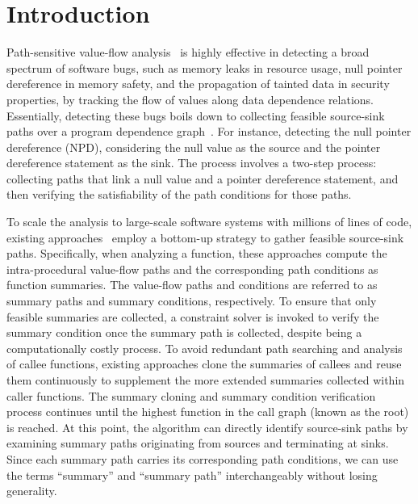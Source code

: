 
\section{Introduction}
\label{sec:intro}

Path-sensitive value-flow analysis~\cite{cherem2007practical,livshits2003tracking,shi2018pinpoint,fan2019smoke, shi2020conquering,shi2021path, sui2014detecting, sui2016sparse, sui2016svf, wang2023anchor, wang2022complexity} is highly effective in detecting a broad spectrum of software bugs,
such as memory leaks in resource usage, null pointer dereference in memory safety, and the propagation of tainted data in security properties,
by tracking the flow of values along data dependence relations.
Essentially, detecting these bugs boils down to collecting feasible source-sink paths over a program dependence graph~\cite{cherem2007practical, shi2018pinpoint}.
For instance, detecting the null pointer dereference (NPD), considering the null value as the source and the pointer dereference statement as the sink. 
The process involves a two-step process: collecting paths that link a null value and a pointer dereference statement, and then verifying the satisfiability of the path conditions for those paths.

To scale the analysis to large-scale software systems with millions of lines of code, existing approaches~\cite{shi2018pinpoint, shi2020conquering, shi2021path, fan2019smoke, babic2008calysto, xie2005scalable,wu2024libalchemy} employ a bottom-up strategy to gather feasible source-sink paths. 
Specifically, when analyzing a function, these approaches compute the intra-procedural value-flow paths and the corresponding path conditions as function summaries.
The value-flow paths and conditions are referred to as summary paths and summary conditions, respectively.
To ensure that only feasible summaries are collected, a constraint solver is invoked to verify the summary condition once the summary path is collected, despite being a computationally costly process.
To avoid redundant path searching and analysis of callee functions, 
existing approaches clone the summaries of callees and reuse them continuously to supplement the more extended summaries collected within caller functions. 
The summary cloning and summary condition verification process continues until the highest function in the call graph (known as the root) is reached. 
At this point, the algorithm can directly identify source-sink paths by examining summary paths originating from sources and terminating at sinks. 
Since each summary path carries its corresponding path conditions, we can use the terms ``summary'' and ``summary path'' interchangeably without losing generality.



